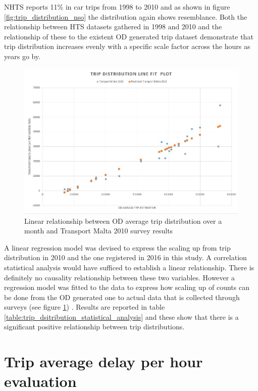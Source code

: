 \documentclass[12pt, a4paper]{report}
\theoremstyle{definition}
\theoremstyle{definition}%
\theoremstyle{definition}%
\theoremstyle{definition}%
\theoremstyle{definition}%
\theoremstyle{definition}%
\begin{document}
NHTS \cite{malta2011national} reports 11\% in car trips from 1998 to 2010 and as shown in figure \ref{fig:trip_distribution_nso} the distribution again shows resemblance. Both the relationship between HTS datasets gathered in 1998 and 2010 and the relationship of these to the existent OD generated trip dataset demonstrate that trip distribution increases evenly with a specific scale factor across the hours as years go by.


\begin{figure}[!]	
	\includegraphics[scale=0.5]{Trip_distribution_line_fit_plot.jpg}
	\centering
	\caption[NHTS and OD average trip distribution linear relationship]{Linear relationship between OD average trip distribution over a month and Transport Malta 2010 survey results \cite{malta2011national}}
	\label{fig:trip_count_correlation_model}
\end{figure}

A linear regression model was devised to express the scaling up from trip distribution in 2010 and the one registered in 2016 in this study. A correlation statistical analysis would have sufficed to establish a linear relationship. There is definitely no causality relationship between these two variables. However a regression model was fitted to the data to express how scaling up of counts can be done from the OD generated one to actual data that is collected through surveys (see figure \ref{fig:trip_count_correlation_model}) . Results are reported in table \ref{table:trip_dsitribution_statistical_analysis} and these show that there is a significant positive relationship between trip distributions.


\section{Trip average delay per hour evaluation} \label{section:trip_average_delay_evaluation}
\end{document}
